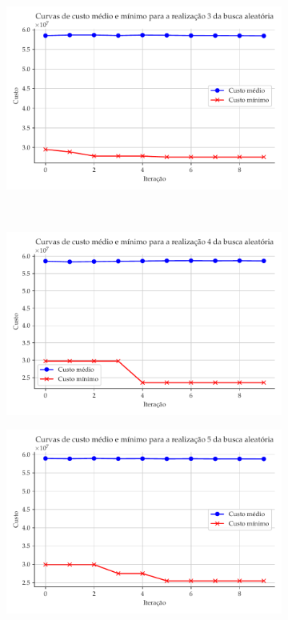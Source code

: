 \documentclass[a4paper, 12pt]{article}
\begin{document}
\begin{figure}[!ht]
\begin{subfigure}{0.4\textwidth}
\end{subfigure}
\begin{subfigure}{0.4\textwidth}
    \includegraphics[width=\textwidth]{figuras/iteracao-3.pdf}
\end{subfigure}
\hfill
\\
\centering
\begin{subfigure}{0.4\textwidth}
    \includegraphics[width=\textwidth]{figuras/iteracao-4.pdf}
\end{subfigure}
\begin{subfigure}{0.4\textwidth}
    \includegraphics[width=\textwidth]{figuras/iteracao-5.pdf}

\end{subfigure}
\end{figure}
\end{document}
